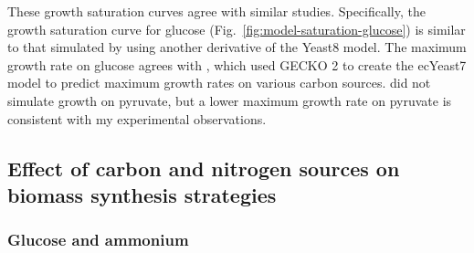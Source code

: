 These growth saturation curves agree with similar studies.
Specifically, the growth saturation curve for glucose (Fig.\ \ref{fig:model-saturation-glucose}) is similar to that simulated by \textcite{elsemmanWholecellModelingYeast2022} using another derivative of the Yeast8 model.
The maximum growth rate on glucose agrees with \textcite{domenzainReconstructionCatalogueGenomescale2022}, which used GECKO 2 to create the ecYeast7 model to predict maximum growth rates on various carbon sources.
\textcite{domenzainReconstructionCatalogueGenomescale2022} did not simulate growth on pyruvate, but a lower maximum growth rate on pyruvate is consistent with my experimental observations.


\subsection{Effect of carbon and nitrogen sources on biomass synthesis strategies}
\label{subsec:model-grid}

\subsubsection{Glucose and ammonium}
\label{subsec:model-grid-glucose}

